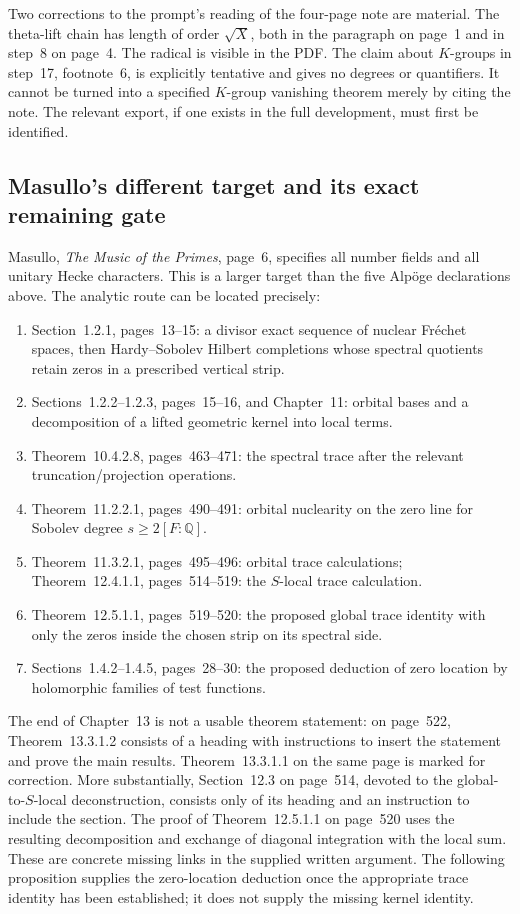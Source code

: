 \documentclass[11pt,a4paper]{article}
\theoremstyle{definition}\newtheorem{definition}[theorem]{Definition}
\theoremstyle{remark}\newtheorem{remark}[theorem]{Remark}
\begin{document}
Two corrections to the prompt's reading of the four-page note are material.
The theta-lift chain has length of order $\sqrt X$, both in the paragraph on
page~1 and in step~8 on page~4.  The radical is visible in the PDF.  The claim
about $K$-groups in step~17, footnote~6, is explicitly tentative and gives no
degrees or quantifiers.  It cannot be turned into a specified $K$-group
vanishing theorem merely by citing the note.  The relevant export, if one
exists in the full development, must first be identified.

\subsection{Masullo's different target and its exact remaining gate}

Masullo, \emph{The Music of the Primes}, page~6, specifies all number fields
and all unitary Hecke characters.  This is a larger target than the five
Alp\"oge declarations above.  The analytic route can be located precisely:
\begin{enumerate}
\item Section~1.2.1, pages~13--15: a divisor exact sequence of nuclear
Fr\'echet spaces, then Hardy--Sobolev Hilbert completions whose spectral
quotients retain zeros in a prescribed vertical strip.
\item Sections~1.2.2--1.2.3, pages~15--16, and Chapter~11: orbital bases
and a decomposition of a lifted geometric kernel into local terms.
\item Theorem~10.4.2.8, pages~463--471: the spectral trace after the
relevant truncation/projection operations.
\item Theorem~11.2.2.1, pages~490--491: orbital nuclearity on the
zero line for Sobolev degree $s\geq 2[F:\mathbb Q]$.
\item Theorem~11.3.2.1, pages~495--496: orbital trace calculations;
Theorem~12.4.1.1, pages~514--519: the $S$-local trace calculation.
\item Theorem~12.5.1.1, pages~519--520: the proposed global trace
identity with only the zeros inside the chosen strip on its spectral side.
\item Sections~1.4.2--1.4.5, pages~28--30: the proposed deduction of
zero location by holomorphic families of test functions.
\end{enumerate}
The end of Chapter~13 is not a usable theorem statement: on page~522,
Theorem~13.3.1.2 consists of a heading with instructions to insert the
statement and prove the main results.  Theorem~13.3.1.1 on the same page is
marked for correction.  More substantially, Section~12.3 on page~514, devoted
to the global-to-$S$-local deconstruction, consists only of its heading and an
instruction to include the section.  The proof of Theorem~12.5.1.1 on
page~520 uses the resulting decomposition and exchange of diagonal integration
with the local sum.  These are concrete missing links in the supplied written
argument.  The following proposition supplies the zero-location deduction
once the appropriate trace identity has been established; it does not supply
the missing kernel identity.
\end{document}
